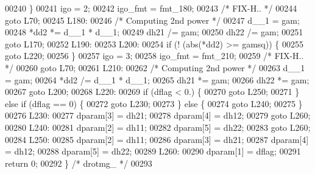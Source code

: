 \begin{DoxyCode}
00240     \}
00241     igo = 2;
00242     igo\_fmt = fmt\_180;
00243 \textcolor{comment}{/*              FIX-H.. */}
00244     \textcolor{keywordflow}{goto} L70;
00245 L180:
00246 \textcolor{comment}{/* Computing 2nd power */}
00247     d\_\_1 = gam;
00248     *dd2 *= d\_\_1 * d\_\_1;
00249     dh21 /= gam;
00250     dh22 /= gam;
00251     \textcolor{keywordflow}{goto} L170;
00252 L190:
00253 L200:
00254     \textcolor{keywordflow}{if} (! (abs(*dd2) >= gamsq)) \{
00255     \textcolor{keywordflow}{goto} L220;
00256     \}
00257     igo = 3;
00258     igo\_fmt = fmt\_210;
00259 \textcolor{comment}{/*              FIX-H.. */}
00260     \textcolor{keywordflow}{goto} L70;
00261 L210:
00262 \textcolor{comment}{/* Computing 2nd power */}
00263     d\_\_1 = gam;
00264     *dd2 /= d\_\_1 * d\_\_1;
00265     dh21 *= gam;
00266     dh22 *= gam;
00267     \textcolor{keywordflow}{goto} L200;
00268 L220:
00269     \textcolor{keywordflow}{if} (dflag < 0.) \{
00270     \textcolor{keywordflow}{goto} L250;
00271     \} \textcolor{keywordflow}{else} \textcolor{keywordflow}{if} (dflag == 0) \{
00272     \textcolor{keywordflow}{goto} L230;
00273     \} \textcolor{keywordflow}{else} \{
00274     \textcolor{keywordflow}{goto} L240;
00275     \}
00276 L230:
00277     dparam[3] = dh21;
00278     dparam[4] = dh12;
00279     \textcolor{keywordflow}{goto} L260;
00280 L240:
00281     dparam[2] = dh11;
00282     dparam[5] = dh22;
00283     \textcolor{keywordflow}{goto} L260;
00284 L250:
00285     dparam[2] = dh11;
00286     dparam[3] = dh21;
00287     dparam[4] = dh12;
00288     dparam[5] = dh22;
00289 L260:
00290     dparam[1] = dflag;
00291     \textcolor{keywordflow}{return} 0;
00292 \} \textcolor{comment}{/* drotmg\_ */}
00293 
\end{DoxyCode}
